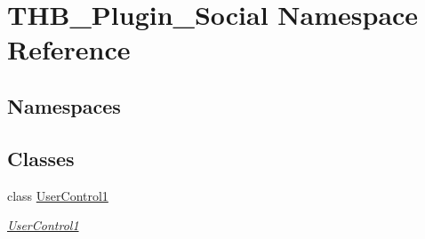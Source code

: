 \hypertarget{namespace_t_h_b___plugin___social}{}\section{T\+H\+B\+\_\+\+Plugin\+\_\+\+Social Namespace Reference}
\label{namespace_t_h_b___plugin___social}
\subsection*{Namespaces}
\begin{DoxyCompactItemize}
\end{DoxyCompactItemize}
\subsection*{Classes}
\begin{DoxyCompactItemize}
\item 
class \mbox{\hyperlink{class_t_h_b___plugin___social_1_1_user_control1}{User\+Control1}}
\begin{DoxyCompactList}\small\item\em \mbox{\hyperlink{class_t_h_b___plugin___social_1_1_user_control1}{User\+Control1}} \end{DoxyCompactList}\end{DoxyCompactItemize}
